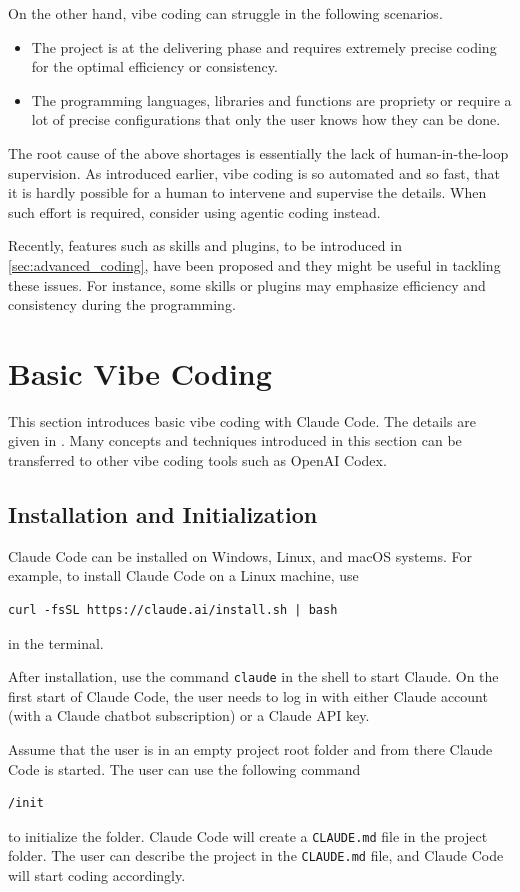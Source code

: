 On the other hand, vibe coding can struggle in the following scenarios.
\begin{itemize}
	\item The project is at the delivering phase and requires extremely precise coding for the optimal efficiency or consistency.
	\item The programming languages, libraries and functions are propriety or require a lot of precise configurations that only the user knows how they can be done.
\end{itemize}
The root cause of the above shortages is essentially the lack of human-in-the-loop supervision. As introduced earlier, vibe coding is so automated and so fast, that it is hardly possible for a human to intervene and supervise the details. When such effort is required, consider using agentic coding instead.

Recently, features such as skills and plugins, to be introduced in \ref{sec:advanced_coding}, have been proposed and they might be useful in tackling these issues. For instance, some skills or plugins may emphasize efficiency and consistency during the programming.

\section{Basic Vibe Coding}

This section introduces basic vibe coding with Claude Code. The details are given in \cite{claudeCode2026overview}. Many concepts and techniques introduced in this section can be transferred to other vibe coding tools such as OpenAI Codex.

\subsection{Installation and Initialization}

Claude Code can be installed on Windows, Linux, and macOS systems. For example, to install Claude Code on a Linux machine, use
\begin{lstlisting}
curl -fsSL https://claude.ai/install.sh | bash
\end{lstlisting}
in the terminal.

After installation, use the command \verb|claude| in the shell to start Claude. On the first start of Claude Code, the user needs to log in with either Claude account (with a Claude chatbot subscription) or a Claude API key.

Assume that the user is in an empty project root folder and from there Claude Code is started. The user can use the following command
\begin{lstlisting}
/init
\end{lstlisting}
to initialize the folder. Claude Code will create a \verb|CLAUDE.md| file in the project folder. The user can describe the project in the \verb|CLAUDE.md| file, and Claude Code will start coding accordingly.

